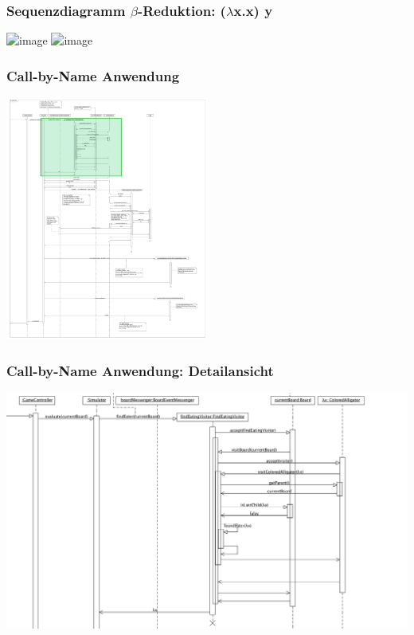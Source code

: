 \documentclass[t]{beamer}
\begin{document}
\begin{frame}
	\frametitle{Sequenzdiagramm \(\beta\)-Reduktion: (\(\lambda\)x.x) y}
	\begin{center}
	\includegraphics<1>[width= 0.4\textwidth]{Alligator1.png}
	\includegraphics<2>[width=0.5\textwidth]{Beta-Reduktion.png}
	\end{center}
\end{frame}

\begin{frame}
	\frametitle{Call-by-Name Anwendung}
	\begin{center}
	\includegraphics[width=0.5\textwidth]{Beta-Reduktion-withGreen.png}
	\end{center}
\end{frame}

\begin{frame}
	\frametitle{Call-by-Name Anwendung: Detailansicht}
	\includegraphics[width=\textwidth]{FindLocation.png}
\end{frame}
\end{document}
